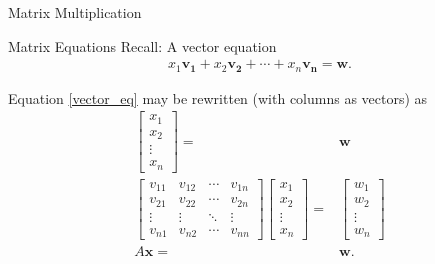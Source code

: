 \documentclass[10pt, aspectratio=169]{beamer}
\begin{document}
\begin{frame}{Matrix Multiplication}

\end{frame}



\begin{frame}{Matrix Equations}
    Recall: A vector equation 
    \begin{align}\label{vector_eq}
    x_1\mathbf{v_1} + x_2\mathbf{v_2} + \cdots + x_n\mathbf{v_n} = \mathbf{w}.
    \end{align}

   Equation \eqref{vector_eq} may be rewritten (with columns as vectors) as 
   \begin{align*}
       [\mathbf{v_1} \; \mathbf{v_2} \; \cdots \; \mathbf{v_n}]
       \begin{bmatrix}
           x_1\\
           x_2\\
           \vdots\\
           x_n
       \end{bmatrix}
       =& \mathbf{w}
       \\
       \begin{bmatrix}
           v_{11} & v_{12} & \cdots & v_{1n}\\
           v_{21} & v_{22} & \cdots & v_{2n}\\
           \vdots & \vdots & \ddots & \vdots\\
           v_{n1} & v_{n2} & \cdots & v_{nn}
       \end{bmatrix}
       \begin{bmatrix}
           x_1\\
           x_2\\
           \vdots\\
           x_n
       \end{bmatrix}
       =&
       \begin{bmatrix}
           w_1\\
           w_2\\
           \vdots\\
           w_n
       \end{bmatrix}
       \\
       A\mathbf{x} =& \mathbf{w}.
   \end{align*}  
\end{frame}
\end{document}
